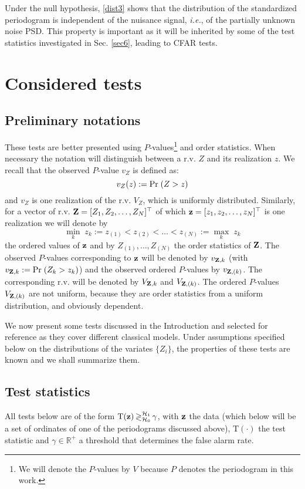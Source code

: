 \documentclass[journal]{IEEEtran}
\begin{document}
Under the null hypothesis,  \eqref{dist3} shows that the distribution of the standardized periodogram is independent of the nuisance signal, \textit{i.e.}, of the partially unknown noise PSD. This  property is  important as it will be inherited by some of the test statistics investigated in Sec. \ref{sec6}, leading to  CFAR tests.
\section{Considered tests}
 \label{sec4}
\subsection{Preliminary notations}
{ These tests are better presented using $P$-values\footnote{We will denote the $P$-values 
by $V$ because $P$ denotes the periodogram in this work.} and order statistics. When necessary
the notation will distinguish between a r.v.  $Z$ and its realization $z$. We recall that the observed 
$P$-value $v_Z$ 
 { is defined as:}
$$
	v_Z(z)  := \textrm{Pr\;} (Z>z)
$$
and $v_Z$ is one realization of the r.v. $V_Z$, which is uniformly distributed.
Similarly,  for a vector of r.v.  ${\bf{Z}}=[Z_1,Z_2,\hdots,Z_N]^\top$ of which ${\bf{z}}=[z_1,z_2,\hdots,z_N]^\top$
 is one realization we  will denote by
 $$ \displaystyle{\min_k\;} {{z_k}}:=z_{(1)}<z_{(2)}< \hdots<{ z_{(N)}} := \max_k \; {{z_k}}$$
 the ordered values of ${\bf{z}}$ and by $Z_{(1)},\hdots,Z_{(N)}$ the  order statistics of  ${\bf{Z}}$.
The observed $P$-values corresponding to ${\bf{z}}$ will be denoted by $v_{{\bf{Z}},k}$ (with $v_{{\bf{Z}},k} := \textrm{Pr\;} (Z_k>z_k)$)
and the observed ordered  $P$-values by $v_{{\bf{Z}},(k)}$. The corresponding r.v. will be denoted  by
 $V_{{\bf{Z}},k}$ and $V_{{\bf{Z}},(k)}$. The ordered $P$-values $V_{{\bf{Z}},(k)}$ are not uniform, because they are order statistics 
 from a uniform distribution, and obviously dependent{\cite{David_2003}}.

 
 }

We now present  some  tests discussed in the Introduction and selected for reference as they  cover different { classical models}. 
Under { assumptions specified below} on the distributions of  the variates $\{Z_i\}$,  the properties of these tests are {
 known and we shall summarize them}. 
 
 
 \subsection{ { Test} statistics}
 \label{Sec_tests_cl}
 All tests below are of the form
  ${\rm T}({\bf{z}})  \mathop{\gtrless}_{\mathcal{H}_0}^{\mathcal{H}_1} \gamma$,  
  with  { ${\bf{z}}$ the data (which below will be a set of  ordinates of one of the periodograms discussed above),  T$(\cdot)$ the test statistic and $\gamma\in \mathbb{R^+}$  a threshold that determines the false alarm rate. \\
  
}
  
\end{document}
